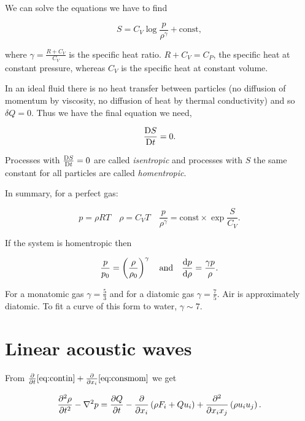 \documentclass{notes}
\begin{document}
We can solve the equations we have to find

\begin{equation}\label{eq:entropy}
S = C_V \log \frac{p}{\rho^\gamma} + \text{const},
\end{equation}

where $\gamma = \frac{R + C_V}{C_V}$ is the specific heat ratio.
$R + C_V = C_P$, the specific heat at constant pressure, whereas $C_V$
is the specific heat at constant volume.

In an ideal fluid there is no heat transfer between particles
(no diffusion of momentum by viscosity, no diffusion of heat by
thermal conductivity) and so $\delta Q = 0$.  Thus we have the final
equation we need,

\begin{equation}\label{eq:consent}
\frac{\mathrm{D} S}{\mathrm{D} t} = 0.
\end{equation}

Processes with $\frac{\mathrm{D} S}{\mathrm{D} t} = 0$ are called \emph{isentropic} and processes
with $S$ the same constant for all particles are called \emph{homentropic}.

In summary, for a perfect gas:

\begin{equation}\label{eq:gassum}
p = \rho R T \quad \rho = C_V T \quad \frac{p}{\rho^\gamma}
= \text{const} \times \exp \frac{S}{C_V}.
\end{equation}

If the system is homentropic then

\begin{equation}\label{eq:homent}
\frac{p}{p_0} = \left(\frac{\rho}{\rho_0}\right)^\gamma \quad
\text{and} \quad \frac{\mathrm{d} p}{\mathrm{d}\rho} = \frac{\gamma p}{\rho}.
\end{equation}

For a monatomic gas $\gamma = \tfrac{5}{3}$ and for a diatomic
gas $\gamma = \tfrac{7}{5}$.  Air is approximately diatomic.  To fit
a curve of this form to water, $\gamma \sim 7$.

\section{Linear acoustic waves}

From $\frac{\partial }{\partial t} \eqref{eq:contin} + \frac{\partial }{\partial x_i} \eqref{eq:consmom}$
we get

\begin{equation}\label{eq:fullwave}
\frac{\partial ^2 \rho}{\partial t^2} - \nabla^2 p = \frac{\partial Q}{\partial t} - \frac{\partial }{\partial x_i}
\left( \rho F_i + Q u_i \right) + \frac{\partial ^2}{\partial x_i x_j}
\left( \rho u_i u_j \right).
\end{equation}
\end{document}
